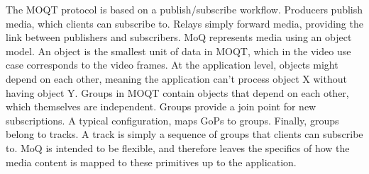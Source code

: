 The \ac{MOQT} protocol is based on a publish/subscribe workflow. Producers publish media, which clients can subscribe to. Relays simply forward media, providing the link between publishers and subscribers. \ac{MoQ} represents media using an object model. An object is the smallest unit of data in MOQT, which in the video use case corresponds to the video frames. At the application level, objects might depend on each other, meaning the application can't process object X without having object Y. Groups in MOQT contain objects that depend on each other, which themselves are independent. Groups provide a join point for new subscriptions. A typical configuration, maps GoPs to groups. Finally, groups belong to tracks. A track is simply a sequence of groups that clients can subscribe to. MoQ is intended to be flexible, and therefore leaves the specifics of how the media content is mapped to these primitives up to the application. 


